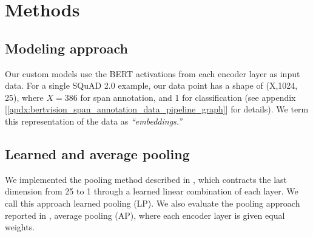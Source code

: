 %
%
\begingroup
\renewcommand{\cleardoublepage}{}
\renewcommand{\clearpage}{}
\chapter*{Methods}\label{chap:Methods}
\renewcommand{\chapter}[2]{}%



\label{sec:methods}
\doubleline
\vspace{-1em}

\section{Modeling approach}

Our custom models use the BERT activations from each encoder layer as input data. For a single SQuAD 2.0 example, our data point has a shape of (X,1024, 25), where $X=386$ for span annotation, and 1 for classification (see appendix [\ref{apdx:bertvision_span_annotation_data_pipeline_graph}] for details). We term this representation of the data as \textit{“embeddings.”}

\section{Learned and average pooling}

We implemented the pooling method described in \cite{tenney-etal-2019-bert}, which contracts the last dimension from 25 to 1 through a learned linear combination of each layer. We call this approach learned pooling (LP). We also evaluate the pooling approach reported in \cite{ma2019universal}, average pooling (AP), where each encoder layer is given equal weights. 

